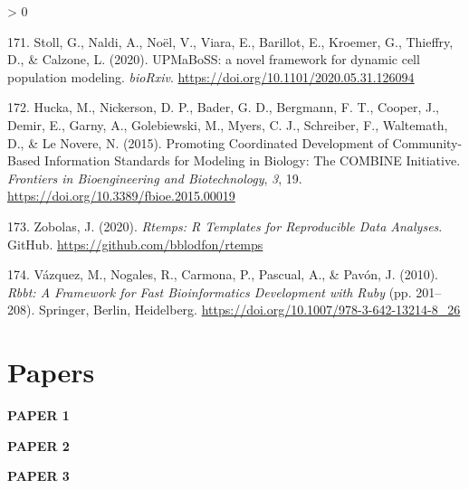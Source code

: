 \documentclass[
  12pt,
]{book}
\newlength{\cslhangindent}
\newenvironment{CSLReferences}[2] %
 {%
  \setlength{\parindent}{0pt}
  \ifodd #1 \everypar{\setlength{\hangindent}{\cslhangindent}}\ignorespaces\fi
  \ifnum #2 > 0
  \setlength{\parskip}{#2\baselineskip}
  \fi
 }%
 {}
\begin{document}
\begin{CSLReferences}{1}{0}
\leavevmode\hypertarget{ref-Stoll2020}{}%
171. Stoll, G., Naldi, A., Noël, V., Viara, E., Barillot, E., Kroemer, G., Thieffry, D., \& Calzone, L. (2020). {UPMaBoSS: a novel framework for dynamic cell population modeling}. \emph{bioRxiv}. \url{https://doi.org/10.1101/2020.05.31.126094}

\leavevmode\hypertarget{ref-Hucka2015}{}%
172. Hucka, M., Nickerson, D. P., Bader, G. D., Bergmann, F. T., Cooper, J., Demir, E., Garny, A., Golebiewski, M., Myers, C. J., Schreiber, F., Waltemath, D., \& Le Novere, N. (2015). {Promoting Coordinated Development of Community-Based Information Standards for Modeling in Biology: The COMBINE Initiative}. \emph{Frontiers in Bioengineering and Biotechnology}, \emph{3}, 19. \url{https://doi.org/10.3389/fbioe.2015.00019}

\leavevmode\hypertarget{ref-rtemps}{}%
173. Zobolas, J. (2020). \emph{{Rtemps: R Templates for Reproducible Data Analyses}}. GitHub. \url{https://github.com/bblodfon/rtemps}

\leavevmode\hypertarget{ref-Vazquez2010}{}%
174. Vázquez, M., Nogales, R., Carmona, P., Pascual, A., \& Pavón, J. (2010). \emph{{Rbbt: A Framework for Fast Bioinformatics Development with Ruby}} (pp. 201--208). Springer, Berlin, Heidelberg. \url{https://doi.org/10.1007/978-3-642-13214-8_26}

\end{CSLReferences}

\backmatter

\chapter{Papers}
\newpage

\begin{center}
\textbf{\fontsize{70}{1} \selectfont PAPER 1}
\end{center}



\begin{center}
\textbf{\fontsize{70}{1} \selectfont PAPER 2}
\end{center}



\begin{center}
\textbf{\fontsize{70}{1} \selectfont PAPER 3}
\end{center}
\end{document}
